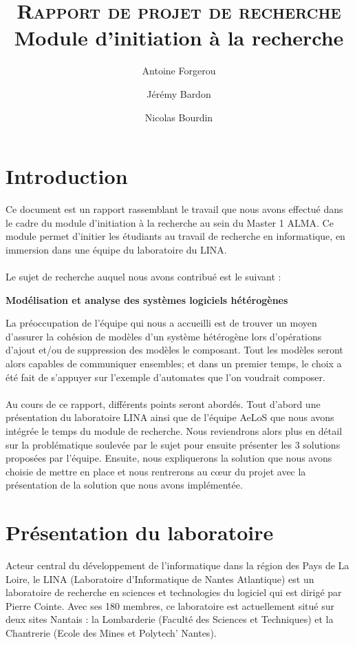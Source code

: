 \documentclass[12pt,a4paper]{report}
\title{\textsc{Rapport de projet de recherche}\\\Large{Module d'initiation à la recherche}}
\author{Antoine Forgerou \and Jérémy Bardon \and Nicolas Bourdin}
\date{}
\begin{document}
	\renewcommand{\contentsname}{Sommaire}

	\maketitle	

	\tableofcontents	
	\newpage
	
	\setlength{\unitlength}{1cm}
	\setcounter{page}{1}
	
\chapter{Introduction}
Ce document est un rapport rassemblant le travail que nous avons effectué dans le cadre du module 
d'initiation à la recherche au sein du Master 1 ALMA. Ce module permet d'initier 
les étudiants au travail de recherche en informatique, en immersion dans une équipe
du laboratoire du LINA. 
\\\\
Le sujet de recherche auquel nous avons contribué est le suivant : 

\begin{center}
	  \textbf{Modélisation et analyse des systèmes logiciels hétérogènes}
\end{center}

La préoccupation de l'équipe qui nous a accueilli est de trouver un moyen d'assurer la cohésion 
de modèles d'un système
hétérogène lors d'opérations d'ajout et/ou de suppression des modèles le composant. 
Tout les modèles seront alors capables de communiquer ensembles; et dans un premier temps, 
le choix a été fait de s'appuyer sur l'exemple d'automates que l'on voudrait composer.
\\\\
Au cours de ce rapport, différents points seront abordés. Tout d'abord une 
présentation du laboratoire LINA ainsi que de l'équipe AeLoS que nous avons intégrée le 
temps du module de recherche. Nous reviendrons alors plus en détail sur la 
problématique soulevée par le sujet pour ensuite présenter les 3 solutions proposées
par l'équipe. Ensuite, nous expliquerons la solution que nous avons choisie de mettre 
en place et nous rentrerons au cœur du projet avec la présentation de la solution
que nous avons implémentée.	

\chapter{Présentation du laboratoire}
Acteur central du développement de l'informatique dans la région des Pays de La Loire, le LINA (Laboratoire d'Informatique de Nantes Atlantique) est un laboratoire de recherche en sciences et technologies du logiciel qui est dirigé par Pierre Cointe. Avec ses 180 membres, ce laboratoire est actuellement situé sur deux sites Nantais : la Lombarderie (Faculté des Sciences et Techniques) et la Chantrerie (Ecole des Mines et Polytech' Nantes).
\end{document}
